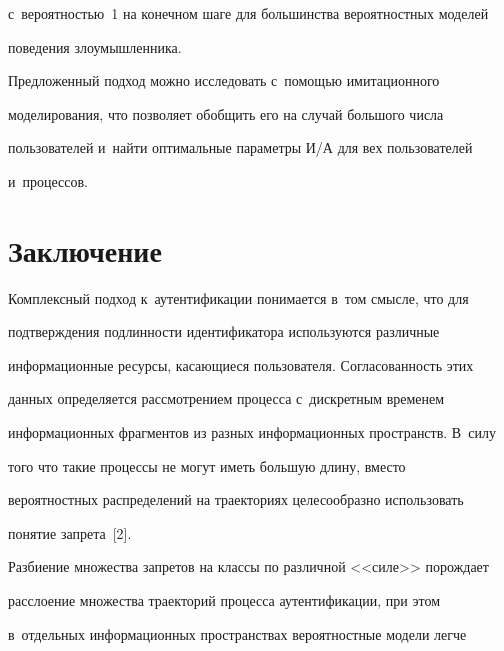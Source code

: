 с~вероятностью~1 на конечном шаге для большинства вероятностных моделей 


поведения злоумышленника.


  


  Предложенный подход можно исследовать с~помощью имитационного 


моделирования, что позволяет обобщить его на случай большого числа 


пользователей и~найти оптимальные параметры И\!/\!А для вех пользователей 


и~процессов.





\vspace*{-4pt}





\section{Заключение}





\vspace*{-2pt}


  


  Комплексный подход к~аутентификации понимается в~том смысле, что для 


подтверждения подлинности идентификатора используются различные 


информационные ресурсы, касающиеся пользователя. Согласованность этих 


данных определяется рассмотрением процесса с~дискретным временем 


информационных фрагментов из разных информационных пространств. В~силу 


того что такие процессы не могут иметь большую длину, вместо 


вероятностных распределений на траекториях целесообразно использовать 


понятие запрета~[2]. 


  


  Разбиение множества запретов на классы по различной <<силе>> порождает 


расслоение множества траекторий процесса аутентификации, при этом 


в~отдельных информационных пространствах вероятностные модели легче 


